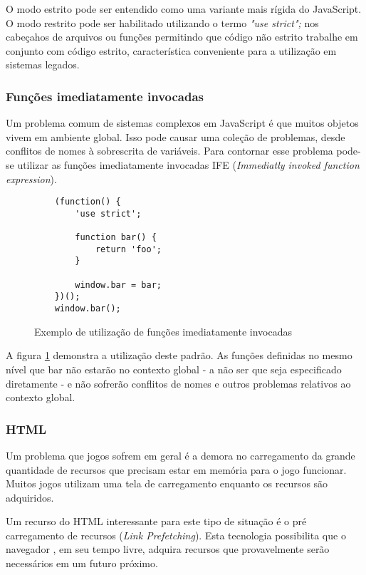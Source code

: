 \begin{draft}
\begin{draft}
O modo estrito pode ser entendido como uma variante mais rígida
do JavaScript. O modo restrito pode ser habilitado utilizando o
termo \textit{"use strict";} nos cabeçahos de arquivos ou funções
permitindo que código não estrito trabalhe em conjunto com código
estrito, característica conveniente para a utilização em sistemas
legados.

\subsubsection{Funções imediatamente invocadas}

Um problema comum de sistemas complexos em JavaScript é que muitos
objetos vivem em ambiente global. Isso pode causar uma coleção de
problemas, desde conflitos de nomes à sobrescrita de variáveis. Para
contornar esse problema pode-se utilizar as funções imediatamente
invocadas IFE (\textit{Immediatly invoked function expression}).
\end{draft}

\begin{figure}
\centering
\begin{verbatim}
    (function() {
        'use strict';

        function bar() {
            return 'foo';
        }

        window.bar = bar;
    })();
    window.bar();
\end{verbatim}
\caption{Exemplo de utilização de funções imediatamente invocadas}
\label{fig:iife}
\end{figure}
\begin{draft}

A figura \ref{fig:iife} demonstra a utilização deste padrão. As
funções definidas no mesmo nível que bar não estarão no contexto
global - a não ser que seja especificado diretamente - e não sofrerão
conflitos de nomes e outros problemas relativos ao contexto global.

\subsubsection{HTML}

Um problema que jogos sofrem em geral é a demora no carregamento da
grande quantidade de recursos que precisam estar em memória para o jogo
funcionar. Muitos jogos utilizam uma tela de carregamento enquanto os 
recursos são adquiridos.

Um recurso do HTML interessante para este tipo de situação é o pré
carregamento de recursos (\textit{Link Prefetching}). Esta tecnologia
possibilita que o navegador , em seu tempo livre, adquira recursos que
provavelmente serão necessários em um futuro próximo.


\end{draft}
\end{draft}
